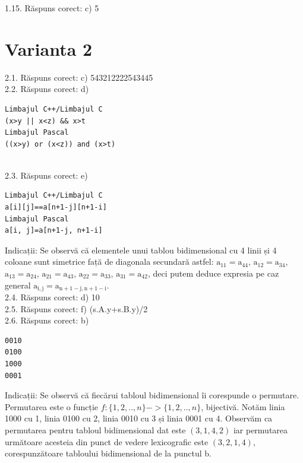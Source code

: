 1.15. Răspuns corect: c) 5\\

\section*{Varianta 2}

2.1. Răspuns corect: c) 543212222543445\\

2.2. Răspuns corect: d)\\
\begin{verbatim}
Limbajul C++/Limbajul C
(x>y || x<z) && x>t
Limbajul Pascal
((x>y) or (x<z)) and (x>t)
\end{verbatim}\\

2.3. Răspuns corect: e)\\
\begin{verbatim}
Limbajul C++/Limbajul C
a[i][j]==a[n+1-j][n+1-i]
Limbajul Pascal
a[i, j]=a[n+1-j, n+1-i]
\end{verbatim}
Indicații: Se observă că elementele unui tablou bidimensional cu 4 linii și 4 coloane sunt simetrice față de diagonala secundară astfel: $\mathrm{a}_{11}=\mathrm{a}_{44}$, $\mathrm{a}_{12}=\mathrm{a}_{34}$, $\mathrm{a}_{13}=\mathrm{a}_{24}$, $\mathrm{a}_{21}=\mathrm{a}_{43}$, $\mathrm{a}_{22}=\mathrm{a}_{33}$, $\mathrm{a}_{31}=\mathrm{a}_{42}$, deci putem deduce expresia pe caz general $\mathrm{a}_{\mathrm{i}, \mathrm{j}}=\mathrm{a}_{\mathrm{n}+1-\mathrm{j}, \mathrm{n}+1-\mathrm{i}}$.\\

2.4. Răspuns corect: d) 10\\

2.5. Răspuns corect: f) (s.A.y+s.B.y)/2\\

2.6. Răspuns corect: b)\\
\begin{verbatim}
0010
0100
1000
0001
\end{verbatim}
Indicații: Se observă că fiecărui tabloul bidimensional îi corespunde o permutare. Permutarea este o funcție $f:\{1,2,..,n\}->\{1,2,..,n\}$, bijectivă. Notăm linia 1000 cu 1, linia 0100 cu 2, linia 0010 cu 3 și linia 0001 cu 4. Observăm ca permutarea pentru tabloul bidimensional dat este $(3,1,4,2)$ iar permutarea următoare acesteia din punct de vedere lexicografic este $(3,2,1,4)$, corespunzătoare tabloului bidimensional de la punctul b.\\

